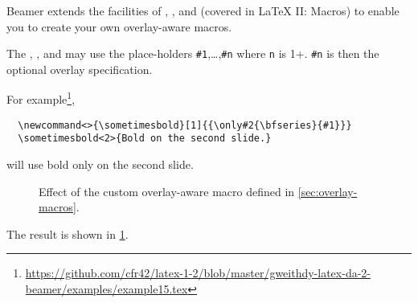 Beamer extends the facilities of , ,  and  (covered in \LaTeX{} II: Macros) to enable you to create your own overlay-aware macros.
\medskip
\par
\noindent
{}
\par
\noindent
{}
\par
\noindent
{}
\par
\noindent
{}
\medskip
\par
\noindent
The , ,  and  may use the place-holders \texttt{\#1},\dots,\texttt{\#n} where \texttt{n} is 1+.
\texttt{\#n} is then the optional overlay specification.

For example\footnote{\url{https://github.com/cfr42/latex-1-2/blob/master/gweithdy-latex-da-2-beamer/examples/example15.tex}},
\begin{verbatim}
  \newcommand<>{\sometimesbold}[1]{{\only#2{\bfseries}{#1}}}
  \sometimesbold<2>{Bold on the second slide.}
\end{verbatim}
will use bold only on the second slide.


\begin{figure}
  \centering
  \caption{Effect of the custom overlay-aware macro defined in \cref{sec:overlay-macros}.}\label{fig:overlay-macros}
\end{figure}
The result is shown in \cref{fig:overlay-macros}.




